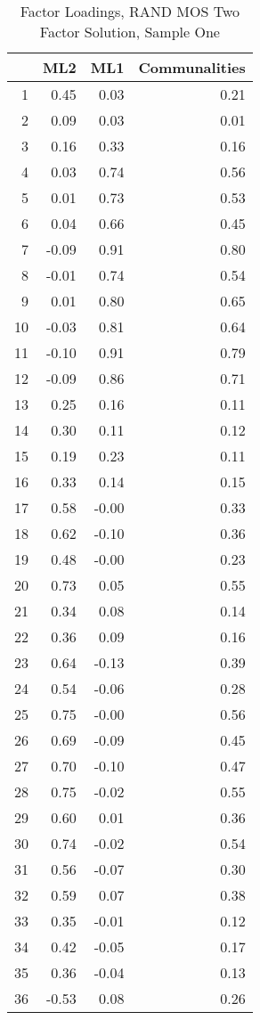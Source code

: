 \documentclass{article}
\begin{document}
\begin{table}[ht]
\centering
\begin{tabular}{rrrr}
  \hline
 & ML2 & ML1 & Communalities \\ 
  \hline
1 & 0.45 & 0.03 & 0.21 \\ 
  2 & 0.09 & 0.03 & 0.01 \\ 
  3 & 0.16 & 0.33 & 0.16 \\ 
  4 & 0.03 & 0.74 & 0.56 \\ 
  5 & 0.01 & 0.73 & 0.53 \\ 
  6 & 0.04 & 0.66 & 0.45 \\ 
  7 & -0.09 & 0.91 & 0.80 \\ 
  8 & -0.01 & 0.74 & 0.54 \\ 
  9 & 0.01 & 0.80 & 0.65 \\ 
  10 & -0.03 & 0.81 & 0.64 \\ 
  11 & -0.10 & 0.91 & 0.79 \\ 
  12 & -0.09 & 0.86 & 0.71 \\ 
  13 & 0.25 & 0.16 & 0.11 \\ 
  14 & 0.30 & 0.11 & 0.12 \\ 
  15 & 0.19 & 0.23 & 0.11 \\ 
  16 & 0.33 & 0.14 & 0.15 \\ 
  17 & 0.58 & -0.00 & 0.33 \\ 
  18 & 0.62 & -0.10 & 0.36 \\ 
  19 & 0.48 & -0.00 & 0.23 \\ 
  20 & 0.73 & 0.05 & 0.55 \\ 
  21 & 0.34 & 0.08 & 0.14 \\ 
  22 & 0.36 & 0.09 & 0.16 \\ 
  23 & 0.64 & -0.13 & 0.39 \\ 
  24 & 0.54 & -0.06 & 0.28 \\ 
  25 & 0.75 & -0.00 & 0.56 \\ 
  26 & 0.69 & -0.09 & 0.45 \\ 
  27 & 0.70 & -0.10 & 0.47 \\ 
  28 & 0.75 & -0.02 & 0.55 \\ 
  29 & 0.60 & 0.01 & 0.36 \\ 
  30 & 0.74 & -0.02 & 0.54 \\ 
  31 & 0.56 & -0.07 & 0.30 \\ 
  32 & 0.59 & 0.07 & 0.38 \\ 
  33 & 0.35 & -0.01 & 0.12 \\ 
  34 & 0.42 & -0.05 & 0.17 \\ 
  35 & 0.36 & -0.04 & 0.13 \\ 
  36 & -0.53 & 0.08 & 0.26 \\ 
   \hline
\end{tabular}
\caption{Factor Loadings, RAND MOS Two Factor Solution, Sample One} 
\label{tab:rand2fact}
\end{table}
\end{document}

